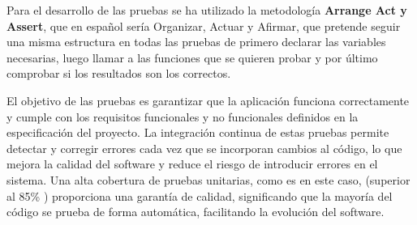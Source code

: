 Para el desarrollo de las pruebas se ha utilizado la metodología \textbf{Arrange Act y Assert}, que en español sería Organizar, Actuar y Afirmar, que pretende seguir una misma estructura en todas las pruebas de primero declarar las variables necesarias, luego llamar a las funciones que se quieren probar y por último comprobar si los resultados son los correctos.

El objetivo de las pruebas es garantizar que la aplicación funciona correctamente y cumple con los requisitos funcionales y no funcionales definidos en la especificación del proyecto.
La integración continua de estas pruebas permite detectar y corregir errores cada vez que se incorporan cambios al código, lo que mejora la calidad del software y reduce el riesgo de introducir errores en el sistema.
Una alta cobertura de pruebas unitarias, como es en este caso, (superior al 85\% ) proporciona una garantía de calidad, significando que la mayoría del código se prueba de forma automática, facilitando la evolución del software.